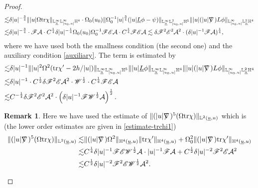 \documentclass[11pt,reqno]{amsart}
\theoremstyle{definition}
\newtheorem{remark}{Remark}[section]
\numberwithin{equation}{section}
\newcommand{\tr}{\mathrm{tr}}
\renewcommand{\L}{\mathbb{L}}
\renewcommand{\H}{\mathbb{H}}
\def\Lb{\underline{L}}
\def\tr{\mathrm{tr}}
\def\ub{\underline{u}}
\def\nablas{\mbox{$\nabla \mkern -13mu /$ }}
\begin{document}
\begin{proof}
\begin{align*}
\lesssim&\delta|u|^{-\frac{3}{4}}\||u|\Omega\tr\chi\|_{\L^\infty_{\ub}\L^\infty_{[u_0,u]}\H^4}\cdot\Omega_0(u_0)\|\Omega_0^{-1}|u|^{\frac{3}{4}}(|u|\Lb\phi-\psi)\|_{\L^\infty_{\ub}\L^2_{[u_0,u]}\H^5}\||u|(|u|\nablas)L\phi\|_{\L^\infty_{[u_0,u]}\L^2_{\ub}\H^4}\\
\lesssim&\delta|u|^{-\frac{3}{4}}\cdot \mathscr{F}\mathcal{A}\cdot C^{\frac{1}{4}}\delta|u|^{-\frac{1}{4}}\Omega_0(u_0)\Omega_0^{-1}\mathscr{F}\mathscr{E}\mathcal{A}\cdot C^{\frac{1}{4}}\mathscr{F}\mathscr{E}\mathcal{A}
\lesssim \delta\mathscr{F}^2\mathscr{E}^2\mathcal{A}^2\cdot(\delta|u|^{-1}\mathscr{F}\mathcal{A})^{\frac{1}{4}},
\end{align*}
where we have used both the smallness condition (the second one) and the auxiliary condition \eqref{auxiliary}. The  term is estimated by
\begin{align*}
\lesssim&\delta|u|^{-1}\||u|^2\Omega^2(\tr\chi'-2h/|u|)\|_{\L^\infty_{\ub}\L^\infty_{[u_0,u]}\H^5}\||u|\Lb\phi\|_{\L^\infty_{\ub}\L^\infty_{[u_0,u]}\H^4}\||u|(|u|\nablas)L\phi\|_{\L^\infty_{[u_0,u]}\L^2_{\ub}\H^4}\\
\lesssim&\delta|u|^{-1}\cdot C^{\frac{1}{2}}\delta\mathscr{F}^2\mathscr{E}\mathcal{A}^2\cdot \mathscr{W}^{\frac{1}{2}}\cdot C^{\frac{1}{4}}\mathscr{F}\mathscr{E}\mathcal{A}\\
\lesssim& C^{-\frac{1}{4}}\delta\mathscr{F}^2\mathscr{E}^2\mathcal{A}^2\cdot\left(\delta|u|^{-1}\mathscr{F}\mathscr{W}^{\frac{1}{2}}\mathcal{A}\right)^{\frac{1}{2}}.
\end{align*}
\begin{remark}
Here we have used the estimate of $\|(|u|\nablas)^5(\Omega\tr\chi)\|_{\L^2(\ub,u)}$  which is (the lower order estimates are given in \eqref{estimate-trchi1})
\begin{equation}\label{estimate-nablas5Omegatrchi-bootstrap}
\begin{split}
\|(|u|\nablas)^5(\Omega\tr\chi)\|_{\L^2(\ub,u)}\lesssim&\|(|u|\nablas)\Omega^2\|_{\H^4(\ub,u)}\|\tr\chi'\|_{\H^4(\ub,u)}+\Omega_0^2\|(|u|\nablas)\tr\chi'\|_{\H^4(\ub,u)}\\
\lesssim&C^{\frac{1}{4}}\delta|u|^{-1}\mathscr{F}\mathscr{E}\mathscr{W}^{\frac{1}{2}}\mathcal{A}\cdot|u|^{-1}\mathscr{F}\mathcal{A}+ C^{\frac{1}{2}}\delta|u|^{-2}\mathscr{F}^2\mathscr{E}\mathcal{A}^2\\
\lesssim& C^{\frac{1}{2}}\delta|u|^{-2}\mathscr{F}^2\mathscr{E}\mathscr{W}^{\frac{1}{2}}\mathcal{A}^2.
\end{split}

\end{equation}
\end{remark}
\end{proof}
\end{document}
